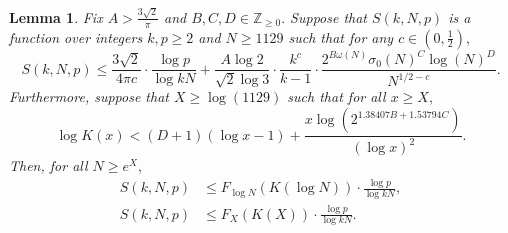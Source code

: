 \documentclass[11pt,letterpaper,reqno]{amsart}
\newtheorem{lemma}[theorem]{Lemma}
\theoremstyle{definition}
\numberwithin{equation}{section}
\numberwithin{figure}{section}
\numberwithin{table}{section}
\begin{document}
{
\renewcommand{\thetheorem}{\ref{lem:lambert-w-function}}
\begin{lemma}
    Fix $A > \frac{3\sqrt{2}}{\pi}$ and $B, C, D \in \mathbb{Z}_{\geq 0}.$ Suppose that $S(k, N, p)$ is a function over integers $k, p \geq 2$ and $N \geq 1129$ such that for any $c \in \left( 0, \frac{1}{2} \right),$
    $$S(k, N, p) \leq \frac{3\sqrt{2}}{4\pi c} \cdot \frac{\log p}{\log kN} + \frac{A\log 2}{\sqrt{2} \log 3} \cdot \frac{k^c}{k - 1} \cdot \frac{2^{ B\omega(N)} \sigma_0(N)^C \log(N)^D}{N^{1/2 - c}}.$$
    Furthermore, suppose that $X \geq \log(1129)$ such that for all $x \geq X,$
    \begin{equation}
            \log K(x) < (D + 1) \left( \log x - 1 \right) + \frac{x \log\left( 2^{1.38407B +  1.53794C} \right)}{\left( \log x \right)^2}.
        \end{equation}
    Then, for all $N \geq e^X,$
    \begin{align}
        S(k, N, p) &\leq F_{\log N} \left( K(\log N)  \right) \cdot \frac{\log p}{\log kN},\\
        S(k, N, p) &\leq F_X(K(X)) \cdot \frac{\log p}{\log kN}.
    \end{align}
\end{lemma}
\addtocounter{theorem}{-1}
}
\end{document}
